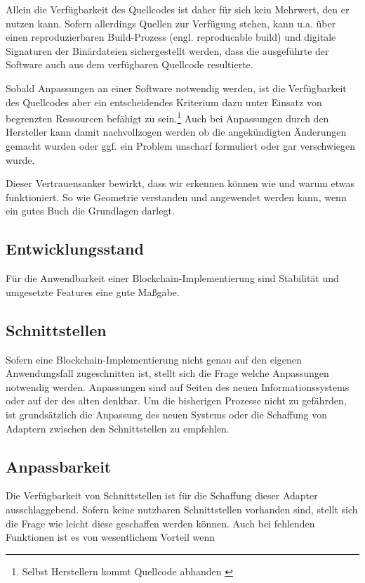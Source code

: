 Allein die Verfügbarkeit des Quellcodes ist daher für sich kein Mehrwert, den er nutzen kann.
Sofern allerdings Quellen zur Verfügung stehen, kann u.a. über einen reproduzierbaren Build-Prozess (engl. reproducable build) und digitale Signaturen der Binärdateien sichergestellt werden, dass die ausgeführte der Software auch aus dem verfügbaren Quellcode resultierte.

Sobald Anpassungen an einer Software notwendig werden, ist die Verfügbarkeit des Quellcodes aber ein entscheidendes Kriterium dazu unter Einsatz von begrenzten Ressourcen befähigt zu sein.\footnote{Selbst Herstellern kommt Quellcode abhanden \autocite{w:ms-binpatch}}
Auch bei Anpassungen durch den Hersteller kann damit nachvollzogen werden ob die angekündigten Änderungen gemacht wurden oder ggf. ein Problem unscharf formuliert oder gar verschwiegen wurde.

Dieser Vertrauensanker bewirkt, dass wir erkennen können wie und warum etwas funktioniert.
So wie Geometrie verstanden und angewendet werden kann, wenn ein gutes Buch die Grundlagen darlegt.

\subsection{Entwicklungsstand}\label{krit:entwicklungsstand}

Für die Anwendbarkeit einer Blockchain-Implementierung sind Stabilität und umgesetzte Features eine gute Maßgabe.


\subsection{Schnittstellen}\label{krit:schnittstellen}

Sofern eine Blockchain-Implementierung nicht genau auf den eigenen Anwendungsfall zugeschnitten ist, stellt sich die Frage welche Anpassungen notwendig werden.
Anpassungen sind auf Seiten des neuen Informationssystems oder auf der des alten denkbar.
Um die bisherigen Prozesse nicht zu gefährden, ist grundsätzlich die Anpassung des neuen Systems oder die Schaffung von Adaptern zwischen den Schnittstellen zu empfehlen.

\subsection{Anpassbarkeit}\label{krit:anpassbarkeit}

Die Verfügbarkeit von Schnittstellen ist für die Schaffung dieser Adapter ausschlaggebend.
Sofern keine nutzbaren Schnittstellen vorhanden sind, stellt sich die Frage wie leicht diese geschaffen werden können.
Auch bei fehlenden Funktionen ist es von wesentlichem Vorteil wenn 

